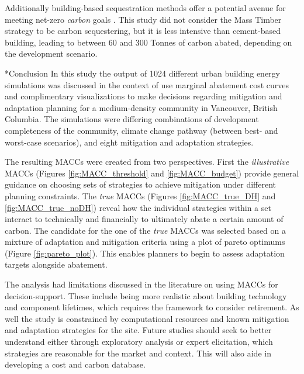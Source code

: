 \documentclass[twocolumn, a4paper,10pt]{article}
\makeatletter
\renewcommand\section{\@startsection{section}{1}{\z@}{3pt}{3pt}{\normalfont\large\bfseries}}
\makeatother
\begin{document}
Additionally building-based sequestration methods offer a potential avenue for meeting net-zero \textit{carbon} goals \citep{skullestad_high-rise_2016, zeitz_comparing_2019}. This study did not consider the Mass Timber strategy to be carbon sequestering, but it is less intensive than cement-based building, leading to between 60 and 300 Tonnes of carbon abated, depending on the development scenario.


\section*{Conclusion}
In this study the output of 1024 different urban building energy simulations was discussed in the context of use marginal abatement cost curves and complimentary visualizations to make decisions regarding mitigation and adaptation planning for a medium-density community in Vancouver, British Columbia. The simulations were differing combinations of development completeness of the community, climate change pathway (between best- and worst-case scenarios), and eight mitigation and adaptation strategies. 

The resulting MACCs were created from two perspectives. First the \textit{illustrative} MACCs (Figures \ref{fig:MACC_threshold} and \ref{fig:MACC_budget}) provide general guidance on choosing sets of strategies to achieve mitigation under different planning constraints. The \textit{true} MACCs (Figures \ref{fig:MACC_true_DH} and \ref{fig:MACC_true_noDH}) reveal how the individual strategies within a set interact to technically and financially to ultimately abate a certain amount of carbon. The candidate for the one of the \textit{true} MACCs was selected based on a mixture of adaptation and mitigation criteria using a plot of pareto optimums (Figure \ref{fig:pareto_plot}). This enables planners to begin to assess adaptation targets alongside abatement.

The analysis had limitations discussed in the literature on using MACCs for decision-support. These include being more realistic about building technology and component lifetimes, which requires the framework to consider retirement. As well the study is constrained by computational resources and known mitigation and adaptation strategies for the site. Future studies should seek to better understand either through exploratory analysis or expert elicitation, which strategies are reasonable for the market and context. This will also aide in developing a cost and carbon database.
\end{document}

